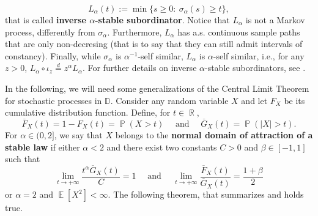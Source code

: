 \documentclass[]{amsart}
\numberwithin{equation}{section}
\theoremstyle{remark}
\theoremstyle{definition}
\DeclareMathOperator{\E}{\mathbb{E}}
\DeclareMathOperator{\R}{\mathbb{R}}
\DeclareMathOperator{\bP}{\mathbb{P}}
\begin{document}
\begin{equation*}
	L_\alpha(t):=\min\{s \ge 0: \ \sigma_\alpha(s) \ge t\},
\end{equation*}
that is called \textbf{inverse $\alpha$-stable subordinator}. Notice that $L_\alpha$ is not a Markov process, differently from $\sigma_\alpha$. Furthermore, $L_\alpha$ has a.s. continuous sample paths that are only non-decresing (that is to say that they can still admit intervals of constancy). Finally, while $\sigma_\alpha$ is $\alpha^{-1}$-self similar, $L_\alpha$ is $\alpha$-self similar, i.e., for any $z>0$, $L_\alpha \circ \iota_z \overset{d}{=}z^{\alpha}L_\alpha$. For further details on inverse $\alpha$-stable subordinators, see \cite{meerschaert2013inverse}. 

In the following, we will need some generalizations of the Central Limit Theorem for stochastic processes in $\mathbb{D}$. Consider any random variable $X$ and let $F_X$ be its cumulative distribution function. Define, for $t \in \R$,
\begin{equation*}
	\overline{F}_X(t)=1-F_X(t)=\bP(X>t) \quad \mbox{ and } \quad \overline{G}_X(t)=\bP(|X|>t).
\end{equation*}
For $\alpha \in (0,2]$, we say that $X$ belongs to the \textbf{normal domain of attraction of a stable law} if either $\alpha<2$ and there exist two constants $C>0$ and $\beta \in [-1,1]$ such that
\begin{equation*}
	\lim_{t \to +\infty}\frac{t^\alpha \overline{G}_X(t)}{C}=1 \quad \mbox{ and } \quad \lim_{t \to +\infty}\frac{\overline{F}_X(t)}{\overline{G}_X(t)}=\frac{1+\beta}{2}
\end{equation*} 
or $\alpha=2$ and $\E[X^2]<\infty$. The following theorem, that summarizes  \cite[Theorem 4.3.2]{whitt2002stochastic} and \cite[Theorem 4.5.3]{whitt2002stochastic} holds true.
\end{document}
